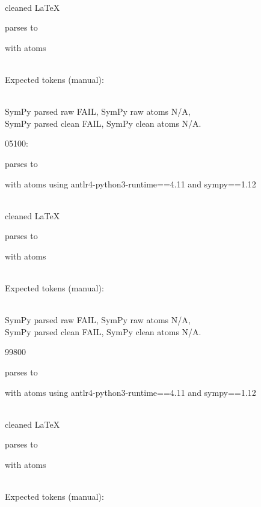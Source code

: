 \documentclass{article}
\begin{document}
\ \\
cleaned \LaTeX

parses to

with atoms


\ \\
Expected tokens (manual):


\ \\
SymPy parsed raw FAIL, 
SymPy raw atoms N/A, \\
SymPy parsed clean FAIL, 
SymPy clean atoms N/A.

\hrulefill

05100:

parses to

with atoms
using antlr4-python3-runtime==4.11 and sympy==1.12

\ \\
cleaned \LaTeX

parses to

with atoms


\ \\
Expected tokens (manual):


\ \\
SymPy parsed raw FAIL, 
SymPy raw atoms N/A, \\
SymPy parsed clean FAIL, 
SymPy clean atoms N/A.

\hrulefill

99800

parses to

with atoms
using antlr4-python3-runtime==4.11 and sympy==1.12

\ \\
cleaned \LaTeX

parses to

with atoms


\ \\
Expected tokens (manual):

\end{document}
